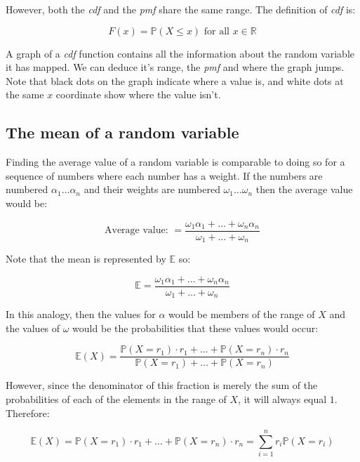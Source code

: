 However, both the {\it cdf} and the {\it pmf} share the same range. The
definition of {\it cdf} is:

\begin{dmath*}
	{F(x) = \mathbb{P}(X \leq x)} \textrm{ for all $x \in \mathbb{R}$}
\end{dmath*}

A graph of a {\it cdf} function contains all the information about the random
variable it has mapped. We can deduce it's range, the {\it pmf} and where the
graph jumps. Note that black dots on the graph indicate where a value is, and
white dots at the same $x$ coordinate show where the value isn't.

\subsection{The mean of a random variable}

Finding the average value of a random variable is comparable to doing so for a
sequence of numbers where each number has a weight. If the numbers are numbered
$\alpha_1 \dots \alpha_n$ and their weights are numbered $\omega_1 \dots
\omega_n$ then the average value would be:

\begin{dmath*}
	\textrm{Average value: } = \frac{\omega_1\alpha_1 + \dots + \omega_n\alpha_n}{\omega_1 + \dots + \omega_n}
\end{dmath*}

Note that the mean is represented by $\mathbb{E}$ so:

\begin{dmath*}
	\mathbb{E} = \frac{\omega_1\alpha_1 + \dots + \omega_n\alpha_n}{\omega_1 + \dots + \omega_n}
\end{dmath*}

In this analogy, then the values for $\alpha$ would be members of the range of
$X$ and the values of $\omega$ would be the probabilities that these values
would occur:

\begin{dmath*}
	\mathbb{E}(X) = \frac{\mathbb{P}(X = r_1) \cdot r_1 + \dots + \mathbb{P}(X = r_n) \cdot r_n}{\mathbb{P}(X = r_1) + \dots + \mathbb{P}(X = r_n)}
\end{dmath*}

However, since the denominator of this fraction is merely the sum of the
probabilities of each of the elements in the range of $X$, it will always equal
$1$. Therefore:

\begin{dmath*}
	\mathbb{E}(X) = {\mathbb{P}(X = r_1) \cdot r_1 + \dots + \mathbb{P}(X = r_n) \cdot r_n} = {\sum\limits_{i=1}^{n} r_i \mathbb{P}(X = r_i)}
\end{dmath*}

